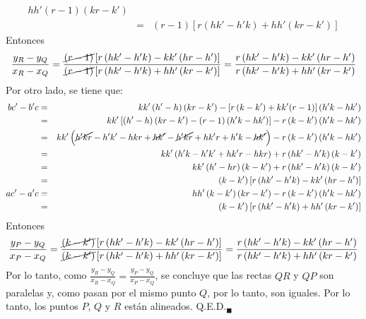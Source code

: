 \begin{solucion}
\begin{eqnarray*}
  hh'(r-1)\left( kr - k' \right) \\
  & = & (r-1)\left[r\left( hk'-h'k\right)+hh'\left( kr-k'\right)\right]
 \end{eqnarray*}
 Entonces
 \begin{equation*}
  \frac{y_R-y_Q}{x_R-x_Q} =
  \frac{\cancel{(r-1)}\left[ r\left( hk'-h'k\right)-kk'\left( hr-h'\right)\right]
  }{
  \cancel{(r-1)}\left[r\left( hk'-h'k\right)+hh'\left( kr-k'\right)\right]
  }
  =
  \frac{r\left( hk'-h'k\right)-kk'\left( hr-h'\right)}{r\left( hk'-h'k\right)+hh'\left( kr-k'\right)}
 \end{equation*}
 Por otro lado, se tiene que:
 \begin{eqnarray*}
  bc'-b'c & = &
  kk'\left( h'-h \right)\left( kr-k' \right) -
  \left[ r\left( k-k'\right) + kk'(r-1) \right]\left( h'k-hk' \right) \\
  & = & kk'\left[ \left( h'-h \right)\left( kr-k' \right) -
  (r-1)\left( h'k-hk' \right) \right] -
  r\left( k - k' \right)\left( h'k - hk' \right) \\
  & = & kk'\left( \cancel{h'kr} - h'k' - hkr + \cancel{hk'} - \cancel{h'kr} + hk'r + h'k - \cancel{hk'} \right)
  - r\left( k - k' \right)\left( h'k - hk' \right) \\
  & = & kk'\left( h'k - h'k' + hk'r - hkr \right) + 
  r\left( hk' - h'k \right)\left( k - k' \right) \\
  & = & kk'\left( h' - hr \right)\left( k-k'\right) +
  r\left( hk' - h'k \right)\left( k - k' \right) \\
  & = & \left( k - k' \right)\left[ r\left( hk' - h'k \right) - kk'\left( hr - h' \right) \right] \\
  ac' - a'c & = &
  hh'\left( k - k' \right)\left( kr - k' \right) - 
  r\left( k - k' \right)\left( h'k - hk' \right) \\
  & = &
  \left( k - k' \right)\left[ r\left( hk' - h'k \right) + 
  hh'\left( kr - k' \right) \right]
 \end{eqnarray*}
 Entonces
 \begin{equation*}
  \frac{y_P - y_Q}{x_P - x_Q} = 
  \frac{
  \cancel{\left( k - k' \right)}
  \left[ r\left( hk' - h'k \right) - kk'\left( hr - h' \right) \right]
  }{
  \cancel{\left( k - k' \right)}
  \left[ r\left( hk' - h'k \right) + hh'\left( kr - k' \right) \right]
  }
  =
  \frac{
  r\left( hk' - h'k \right) - kk'\left( hr - h' \right)
  }{
  r\left( hk' - h'k \right) + hh'\left( kr - k' \right)
  }
 \end{equation*}
 Por lo tanto,
 como $\frac{y_R - y_Q}{x_R - x_Q} = \frac{y_P - y_Q}{x_P - x_Q}$, 
 se concluye que las rectas $QR$ y $QP$ son paralelas
 y, como pasan por el mismo punto $Q$, por lo tanto, son iguales.
 Por lo tanto, los puntos $P$, $Q$ y $R$ est\'an alineados.
 Q.E.D.${}_{\blacksquare}$
 

\end{solucion}
